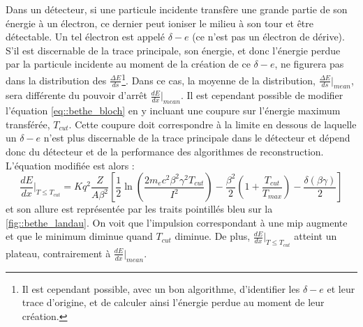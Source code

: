         Dans un détecteur, si une particule incidente transfère une grande partie de son énergie à un électron, ce dernier peut ioniser le milieu à son tour et être détectable. Un tel électron est appelé $\delta-e$ (ce n'est pas un électron de dérive). S'il est discernable de la trace principale, son énergie, et donc l'énergie perdue par la particule incidente au moment de la création de ce $\delta-e$, ne figurera pas dans la distribution des $\frac{\Delta E}{ds}$\footnote{Il est cependant possible, avec un bon algorithme, d'identifier les $\delta-e$ et leur trace d'origine, et de calculer ainsi l'énergie perdue au moment de leur création.}. Dans ce cas, la moyenne de la distribution, $\frac{\Delta E}{ds}\rvert_{mean}$, sera différente du pouvoir d'arrêt $\frac{dE}{dx}\rvert_{mean}$. Il est cependant possible de modifier l'équation \eqref{eq::bethe_bloch} en y incluant une coupure sur l'énergie maximum transférée, $T_{cut}$\cite{pdg2018}. Cette coupure doit correspondre à la limite en dessous de laquelle un $\delta-e$ n'est plus discernable de la trace principale dans le détecteur et dépend donc du détecteur et de la performance des algorithmes de reconstruction. L'équation modifiée est alors :
        \begin{equation}\label{eq::bethe_tcut}
          \frac{dE}{dx}\biggr\rvert_{T\leq T_{cut}} = Kq^2 \frac{Z}{A\beta^2}\left[\frac{1}{2}\ln\left(\frac{2m_ec^2\beta^2\gamma^2T_{cut}}{I^2}\right)-\frac{\beta^2}{2}\left(1+\frac{T_{cut}}{T_{max}}\right)-\frac{\delta(\beta\gamma)}{2} \right]
        \end{equation}
        et son allure est représentée par les traits pointillés bleu sur la \autoref{fig::bethe_landau}. On voit que l'impulsion correspondant à une \gls{mip} augmente  et que le minimum diminue quand $T_{cut}$ diminue. De plus, $\frac{dE}{dx}\rvert_{T\leq T_{cut}}$ atteint un plateau, contrairement à $\frac{dE}{dx}\rvert_{mean}$.
        
